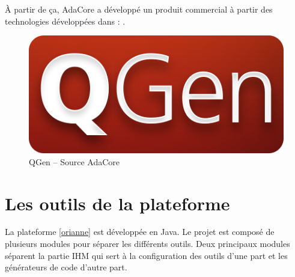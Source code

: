 À partir de ça, AdaCore a développé un produit commercial à partir des
technologies développées dans  : .

\begin{figure}[h]
  \centering
  \includegraphics[scale=0.2]{images/qgen}
  \caption{QGen -- Source AdaCore}
  \label{fig:qgen}
\end{figure}

\section{Les outils de la plateforme}
La plateforme \ref{orianne} est développée en Java. Le projet est composé de plusieurs modules pour séparer les différents outils.
Deux principaux modules séparent la partie IHM qui sert à la configuration des outils d'une part et les générateurs de code d'autre part.
